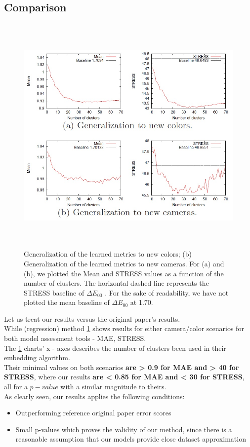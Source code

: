 \subsection{Comparison}

\begin{figure}[h] 
			\includegraphics[width=\linewidth,height=12cm,keepaspectratio]{Figures/original_paper_results}
			\caption[orig res]
			{Generalization of the learned metrics to new colors; (b) Generalization of
			the learned metrics to new cameras. For (a) and (b), we plotted the Mean and STRESS
			values as a function of the number of clusters. The horizontal dashed line represents
			the STRESS baseline of $\Delta E_{00}$ . For the sake of readability, we have not plotted the
			mean baseline of $\Delta E_{00}$ at 1.70.}
\label{original paper results}			
\end{figure}


Let us treat our results versus the original paper's results.\\

While \cite{prep_color} (regression) method
\ref{original paper results} shows results for either camera/color scenarios for both model assessment tools - MAE, STRESS. \\
The \ref{original paper results} charts' x - axes describes the number of clusters been used in their embedding algorithm. \\
Their minimal values on both scenarios\textbf{ are > 0.9 for MAE and > 40 for STRESS}, where our results \textbf{ are < 0.85 for MAE and < 30 for STRESS}, all for a $p - value$ with a similar magnitude to theirs. \\
As clearly seen, our results applies the following conditions:
\begin{itemize}
\item Outperforming reference original paper error scores
\item Small p-values which proves the validity of our method, since there is a reasonable assumption that our models provide close dataset approximation
\end{itemize}

